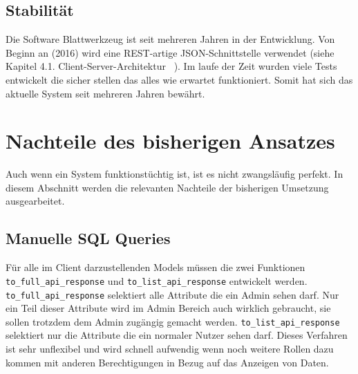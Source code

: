 \subsection{Stabilität}
\label{sec:requirements:pros:stable}
Die Software Blattwerkzeug ist seit mehreren Jahren in der Entwicklung. Von Beginn an (2016) wird
eine REST-artige JSON-Schnittstelle verwendet (siehe Kapitel 4.1. Client-Server-Architektur ~\cite{riemer2016}).
Im laufe der Zeit wurden viele Tests entwickelt die sicher stellen das alles wie erwartet funktioniert.
Somit hat sich das aktuelle System seit mehreren Jahren bewährt.

\section{Nachteile des bisherigen Ansatzes}
\label{sec:requirements:cons:typescript}
Auch wenn ein System funktionstüchtig ist, ist es nicht zwangsläufig perfekt.
In diesem Abschnitt werden die relevanten Nachteile der bisherigen Umsetzung ausgearbeitet.

\subsection{Manuelle SQL Queries}
Für alle im Client darzustellenden Models müssen die zwei Funktionen \lstinline|to_full_api_response| und \lstinline|to_list_api_response| entwickelt werden.
\lstinline|to_full_api_response| selektiert alle Attribute die ein Admin sehen darf. Nur ein Teil dieser Attribute wird im Admin Bereich auch wirklich gebraucht, sie sollen trotzdem dem Admin zugängig gemacht werden.
\lstinline|to_list_api_response| selektiert nur die Attribute die ein normaler Nutzer sehen darf. Dieses Verfahren ist sehr unflexibel und wird schnell aufwendig wenn noch weitere Rollen dazu kommen mit anderen Berechtigungen in Bezug auf das Anzeigen von Daten.

